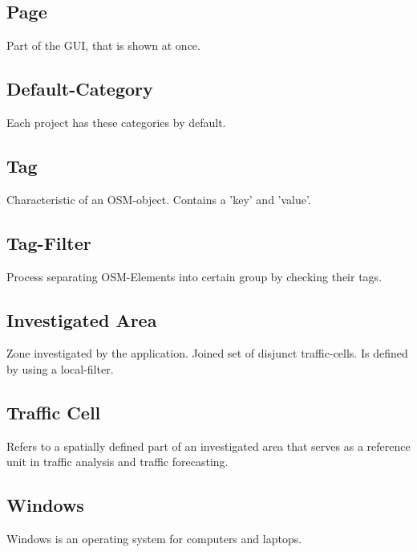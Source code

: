 \documentclass[parskip=full]{scrartcl} %
\begin{document}
\subsection*{Page}
Part of the GUI, that is shown at once.

\subsection*{Default-Category}
Each project has these categories by default.

\subsection*{Tag}
Characteristic of an OSM-object. Contains a 'key' and 'value'.

\subsection*{Tag-Filter}
Process separating OSM-Elements into certain group by checking their tags.

\subsection*{Investigated Area}
Zone investigated by the application. Joined set of disjunct traffic-cells. Is defined by using a local-filter.

\subsection*{Traffic Cell}
Refers to a spatially defined part of an investigated area that serves as a reference unit in traffic analysis and traffic forecasting.

\subsection*{Windows}
Windows is an operating system for computers and laptops.
\end{document}
